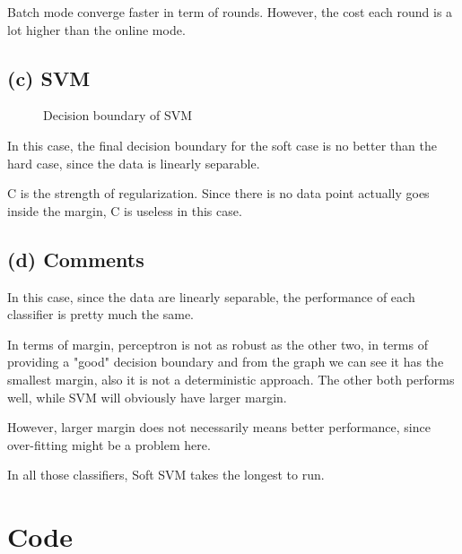 \documentclass[11pt]{article}
\begin{document}
Batch mode converge faster in term of rounds. However, the cost each round is a lot higher than the online mode.
\pagebreak
\subsection*{(c) SVM}
\begin{figure}[h]
	\centering
	\caption{Decision boundary of SVM}
\end{figure}
In this case, the final decision boundary for the soft case is no better than the hard case, since the data is linearly separable.

C is the strength of regularization. Since there is no data point actually goes inside the margin, C is useless in this case.

\subsection*{(d) Comments}

In this case, since the data are linearly separable, the performance of each classifier is pretty much the same. 

In terms of margin, perceptron is not as robust as the other two, in terms of providing a "good" decision boundary and from the graph we can see it has the smallest margin, also it is not a deterministic approach. The other both performs well, while SVM will obviously have larger margin.

However, larger margin does not necessarily means better performance, since over-fitting might be a problem here.   

In all those classifiers, Soft SVM takes the longest to run.
\pagebreak
\section*{Code}

\inputminted[breaklines]{python}{./py/exercise2.py}
\end{document}

